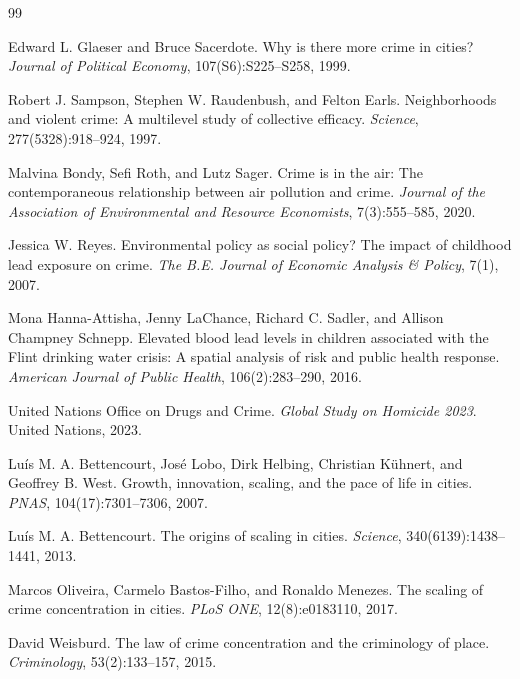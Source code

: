 \documentclass[12pt,letterpaper]{report}
\begin{document}
\begin{thebibliography}{99}

 Edward L. Glaeser and Bruce Sacerdote. Why is there more crime in
cities? \textit{Journal of Political Economy}, 107(S6):S225--S258, 1999.

 Robert J. Sampson, Stephen W. Raudenbush, and Felton Earls.
Neighborhoods and violent crime: A multilevel study of collective efficacy.
\textit{Science}, 277(5328):918--924, 1997.

 Malvina Bondy, Sefi Roth, and Lutz Sager. Crime is in the air: The
contemporaneous relationship between air pollution and crime. \textit{Journal of the
Association of Environmental and Resource Economists}, 7(3):555--585, 2020.

 Jessica W. Reyes. Environmental policy as social policy? The impact of
childhood lead exposure on crime. \textit{The B.E. Journal of Economic Analysis \& Policy},
7(1), 2007.

 Mona Hanna-Attisha, Jenny LaChance, Richard C. Sadler, and Allison
Champney Schnepp. Elevated blood lead levels in children associated with the Flint
drinking water crisis: A spatial analysis of risk and public health response.
\textit{American Journal of Public Health}, 106(2):283--290, 2016.

 United Nations Office on Drugs and Crime. \textit{Global Study on
Homicide 2023}. United Nations, 2023.

 Lu\'is M. A. Bettencourt, Jos\'e Lobo, Dirk Helbing, Christian
K\"uhnert, and Geoffrey B. West. Growth, innovation, scaling, and the pace of life in
cities. \textit{PNAS}, 104(17):7301--7306, 2007.

 Lu\'is M. A. Bettencourt. The origins of scaling in cities.
\textit{Science}, 340(6139):1438--1441, 2013.

 Marcos Oliveira, Carmelo Bastos-Filho, and Ronaldo Menezes. The
scaling of crime concentration in cities. \textit{PLoS ONE}, 12(8):e0183110, 2017.

 David Weisburd. The law of crime concentration and the criminology
of place. \textit{Criminology}, 53(2):133--157, 2015.


\end{thebibliography}
\end{document}
